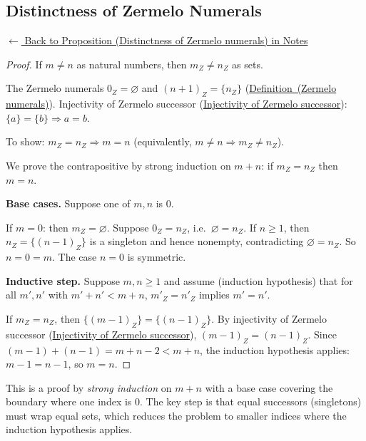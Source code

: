 
\subsection*{Distinctness of Zermelo Numerals}
\label{prf:zermelo-distinct}

\begin{remark*}[Return]
\hyperref[prop:zermelo-distinct]{$\leftarrow$ Back to Proposition (Distinctness of Zermelo numerals) in Notes}
\end{remark*}

\begin{proof}
\Claim If $m \neq n$ as natural numbers, then $m_Z \neq n_Z$ as sets.

\Given The Zermelo numerals $0_Z = \varnothing$ and $(n+1)_Z = \{n_Z\}$
(\hyperref[def:zermelo-numerals]{Definition~(Zermelo numerals)}). Injectivity of
Zermelo successor
(\hyperref[prop:zermelo-successor-injective]{Injectivity of Zermelo successor}):
$\{a\} = \{b\} \Rightarrow a = b$.

\Goal To show: $m_Z = n_Z \Rightarrow m = n$ (equivalently, $m \neq n
\Rightarrow m_Z \neq n_Z$).

\Strategy We prove the contrapositive by strong induction on $m + n$: if $m_Z =
n_Z$ then $m = n$.

\medskip
\noindent\textbf{Base cases.} Suppose one of $m, n$ is $0$.

If $m = 0$: then $m_Z = \varnothing$. Suppose $0_Z = n_Z$, i.e.\ $\varnothing =
n_Z$. If $n \geq 1$, then $n_Z = \{(n-1)_Z\}$ is a singleton and hence
nonempty, contradicting $\varnothing = n_Z$. So $n = 0 = m$. The case $n = 0$
is symmetric.

\medskip
\noindent\textbf{Inductive step.} Suppose $m, n \geq 1$ and assume (induction
hypothesis) that for all $m', n'$ with $m' + n' < m + n$, $m'_Z = n'_Z$
implies $m' = n'$.

If $m_Z = n_Z$, then $\{(m-1)_Z\} = \{(n-1)_Z\}$. By injectivity of Zermelo
successor (\hyperref[prop:zermelo-successor-injective]{Injectivity of Zermelo
successor}), $(m-1)_Z = (n-1)_Z$. Since $(m-1) + (n-1) = m + n - 2 < m + n$,
the induction hypothesis applies: $m - 1 = n - 1$, so $m = n$. \AsReq
\end{proof}

\begin{remark*}
This is a proof by \emph{strong induction} on $m + n$ with a base case
covering the boundary where one index is $0$. The key step is that equal
successors (singletons) must wrap equal sets, which reduces the problem to
smaller indices where the induction hypothesis applies.
\end{remark*}

